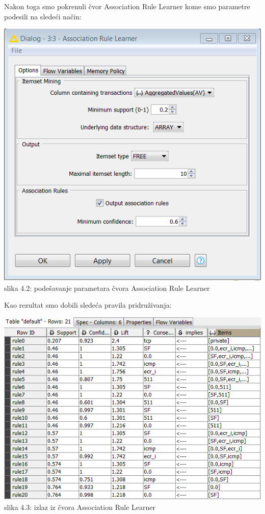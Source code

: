 \documentclass[10pt]{article}
\begin{document}
Nakon toga smo pokrenuli \v cvor Association Rule Learner kome smo parametre podesili na slede\' ci na\v cin:

\begin{center}
\includegraphics[scale = 0.75]{PP2}\\
slika 4.2: pode\v savanje parametara \v cvora Association Rule Learner\\
\end{center}

Kao rezultat smo dobili slede\' ca pravila pridru\v zivanja:

\begin{center}
\includegraphics[scale = 0.8]{PP3novo}\\
slika 4.3: izlaz iz \v cvora Association Rule Learner\\
\end{center}
\end{document}
